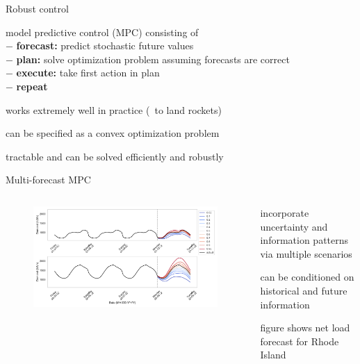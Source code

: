 \documentclass[aspectratio=169,11pt]{beamer}
\begin{document}
\begin{frame}{Robust control}
\BIT
\item model predictive control (MPC) consisting of \\
\hspace{12mm} $-$ \textbf{forecast:} predict stochastic future values \\
\hspace{12mm} $-$ \textbf{plan:} solve optimization problem assuming forecasts are correct \\
\hspace{12mm} $-$ \textbf{execute:} take first action in plan \\
\hspace{12mm} $-$ \textbf{repeat} 
\item works extremely well in practice (\eg \ to land rockets)
\item can be specified as a convex optimization problem
\item tractable and can be solved efficiently and robustly
\EIT
\end{frame}

\begin{frame}{Multi-forecast MPC}
\begin{columns}
	\begin{column}{0.65\textwidth}
		\begin{figure}
			\centering
			\includegraphics[width=\columnwidth]{./figures/marginal_quantile_forecasts.pdf}
		\end{figure}
	\end{column}
	\begin{column}{0.35\textwidth}
		\BIT
		\item incorporate uncertainty and information patterns via multiple scenarios
		\item can be conditioned on historical and future information 
		\item figure shows net load forecast for Rhode Island
		\EIT
	\end{column}
\end{columns}
\end{frame}
\end{document}
